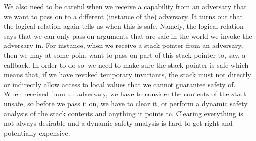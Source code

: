 \documentclass[format=acmsmall, review=true, screen=true]{acmart}
\begin{document}
We also need to be careful when we receive a capability from an adversary that
we want to pass on to a different (instance of the) adversary. It turns out that
the logical relation again tells us when this is safe. Namely, the logical
relation says that we can only pass on arguments that are safe in the world we
invoke the adversary in. For instance, when we receive a stack pointer from an
adversary, then we may at some point want to pass on part of this stack pointer
to, say, a callback. In order to do so, we need to make sure the stack pointer
is safe which means that, if we have revoked temporary invariants, the stack
must not directly or indirectly allow access to local values that we cannot
guarantee safety of. When received from an adversary, we have to consider the
contents of the stack unsafe, so before we pass it on, we have to clear it, or
perform a dynamic safety analysis of the stack contents and anything it points
to. Clearing everything is not always desirable and a dynamic safety analysis is
hard to get right and potentially expensive.
\end{document}
